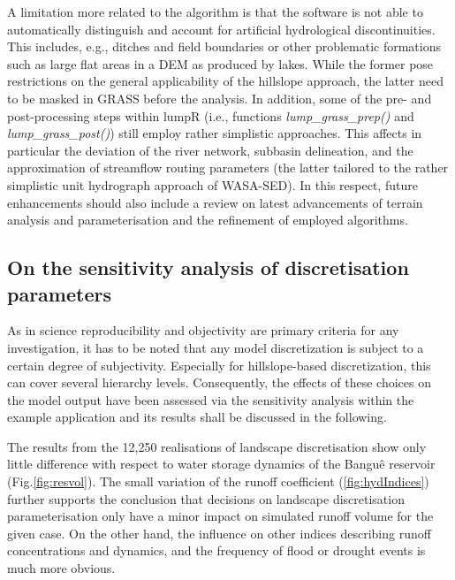 A limitation more related to the algorithm is that the software is not able to automatically distinguish and account for artificial hydrological discontinuities.
This includes, e.g., ditches and field boundaries or other problematic formations such as large flat areas in a DEM as produced by lakes.
While the former pose restrictions on the general applicability of the hillslope approach, the latter need to be masked in GRASS before the analysis.
In addition, some of the pre- and post-processing steps within lumpR (i.e., functions \emph{lump\_grass\_prep()} and \emph{lump\_grass\_post()}) still employ rather simplistic approaches.
This affects in particular the deviation of the river network, subbasin delineation, and the approximation of streamflow routing parameters (the latter tailored to the rather simplistic unit hydrograph approach of WASA-SED).
In this respect, future enhancements should also include a review on latest advancements of terrain analysis and parameterisation and the refinement of employed algorithms.



\subsection{On the sensitivity analysis of discretisation parameters}
As in science reproducibility and objectivity are primary criteria for any investigation, it has to be noted that any model discretization is subject to a certain degree of subjectivity.
Especially for hillslope-based discretization, this can cover several hierarchy levels.
Consequently, the effects of these choices on the model output have been assessed via the sensitivity analysis within the example application and its results shall be discussed in the following.

The results from the 12,250 realisations of landscape discretisation show only little difference with respect to water storage dynamics of the Bangu\^e reservoir (Fig.\DIFaddbegin \DIFadd{\ }\DIFaddend \ref{fig:resvol}).
The small variation of the runoff coefficient (\DIFdelbegin {}\DIFdelend \DIFaddbegin {}\DIFaddend \ref{fig:hydIndices}) further supports the conclusion that decisions on landscape discretisation parameterisation only have a minor impact on simulated runoff volume for the given case.
On the other hand, the influence on other indices describing runoff concentrations and dynamics, and the frequency of flood or drought events is much more obvious.

